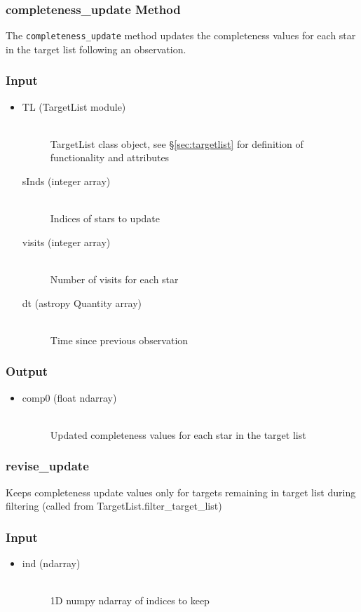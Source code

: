 \documentclass[cleanfoot]{asme2ej}
\begin{document}
\subsubsection{completeness\_update Method}\label{sec:completenessupdatetask}
The \verb+completeness_update+ method updates the completeness values for each star in the target list following an observation.
\subsubsection*{Input}
\begin{itemize}
\item 
\begin{description}
    \item[TL (TargetList module)] \hfill \\ TargetList class object, see \S\ref{sec:targetlist} for definition of functionality and attributes
    \item[sInds (integer array)] \hfill \\ Indices of stars to update
    \item[visits (integer array)] \hfill \\ Number of visits for each star
    \item[dt (astropy Quantity array)] \hfill \\ Time since previous observation
\end{description}
\end{itemize}
\subsubsection*{Output}
\begin{itemize}
\item 
\begin{description}
    \item[comp0 (float ndarray)] \hfill \\
        Updated completeness values for each star in the target list
\end{description}
\end{itemize}

\subsubsection{revise\_update}
Keeps completeness update values only for targets remaining in target list during filtering (called from TargetList.filter\_target\_list)
\subsubsection*{Input}
\begin{itemize}
\item
\begin{description}
    \item[ind (ndarray)] \hfill \\ 1D numpy ndarray of indices to keep
\end{description}
\end{itemize}
\end{document}
